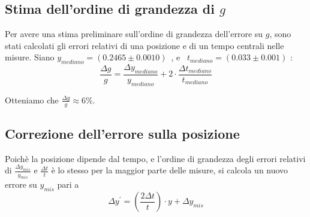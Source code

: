 \documentclass[12pt, a4paper]{article}
\begin{document}
\subsection{Stima dell'ordine di grandezza di $g$}
Per avere una stima preliminare sull'ordine di grandezza dell'errore su $g$, sono stati calcolati gli errori relativi di una posizione e di un tempo centrali nelle misure. Siano $y_{mediano}=(0.2465\pm0.0010)$\ , e \ $t_{mediano}=(0.033\pm0.001)$ :
\begin{equation*}
    \frac{\Delta g}{g}=\frac{\Delta y_{mediano}}{y_{mediano}}+2\cdot \frac{\Delta t_{mediano}}{t_{mediano}}
\end{equation*}

Otteniamo che $\displaystyle\frac{\Delta g}{g}\approx 6\%$.\bigskip\\
\subsection{Correzione dell'errore sulla posizione}
Poichè la posizione dipende dal tempo, e l'ordine di grandezza degli errori relativi di
$\displaystyle{\frac{\Delta y_{mis}}{y_{mis}}}$ e $\displaystyle{\frac{\Delta t}{t}}$ è lo stesso per la maggior parte delle misure, si calcola un nuovo errore su $y_{mis}$ pari a 
\begin{equation*}
   \Delta y^{'} = \left(\frac{2\Delta t}{t}\right)\cdot y + \Delta y_{mis}
\end{equation*}
\end{document}
